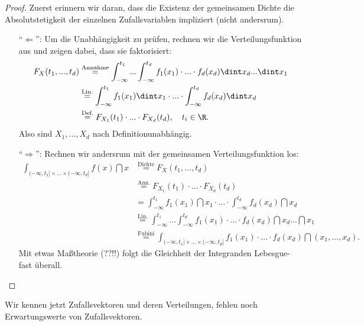 \begin{proof}
	Zuerst erinnern wir daran, dass die Existenz der gemeinsamen Dichte die Absolutstetigkeit der einzelnen Zufallsvariablen impliziert (nicht andersrum). 
	\begin{itemize}
	\item[\enquote{$\Leftarrow$}:] Um die Unabh\"angigkeit zu pr\"ufen, rechnen wir die Verteilungsfunktion aus und zeigen dabei, dass sie faktorisiert:
	\begin{align*}
	F_X(t_1,...,t_d) &\overset{\text{Annahme}}{=} \int_{-\infty}^{t_1} ... \int_{-\infty}^{t_d} f_1(x_1) \cdot ... \cdot f_d(x_d) \dint x_d ... \dint x_1\\
	& \overset{\text{Lin.}}{=} \int_{-\infty}^{t_1} f_1(x_1) \dint x_1 \cdot ... \cdot \int_{-\infty}^{t_d} f_d(x_d) \dint x_d\\
	&\overset{\text{Def.}}{=} F_{X_1}(t_1) \cdot ... \cdot F_{X_d}(t_d),\quad t_i\in\R.
	\end{align*}
	Also sind $X_1,...,X_d$ nach Definitionunabhängig.
	\item[\enquote{$\Rightarrow$}:] Rechnen wir andersrum mit der gemeinsamen Verteilungsfunktion los:	
	\begin{align*}
		\int_{(-\infty,t_1] \times ... \times (-\infty,t_d]} f(x) \dint x &\overset{\text{Dichte}}{=} F_X(t_1,...,t_d)\\
		& \overset{\text{Ann.}}{=} F_{X_1}(t_1) \cdot ... \cdot F_{X_d}(t_d)\\
		& = \int_{-\infty}^{t_1} f_1(x_1) \dint x_1 \cdot ... \cdot \int_{-\infty}^{t_d} f_d(x_d)\dint x_d\\
		&\overset{\text{Lin.}}{=}\int_{-\infty}^{t_1} ... \int_{-\infty}^{t_d} f_1(x_1) \cdot ... \cdot f_d(x_d) \dint x_d ... \dint x_1\\
		& \overset{\text{Fubini}}{=} \int_{(-\infty,t_1] \times ... \times (-\infty,t_d]} f_1(x_1) \cdot ... \cdot f_d(x_d) \dint (x_1,...,x_d).
	\end{align*}
	Mit etwas Ma\ss theorie (??!!) folgt die Gleichheit der Integranden Lebesgue-fast \"uberall.
	\end{itemize}
\end{proof}
Wir kennen jetzt Zufallsvektoren und deren Verteilungen, fehlen noch Erwartungswerte von Zufallsvektoren.

